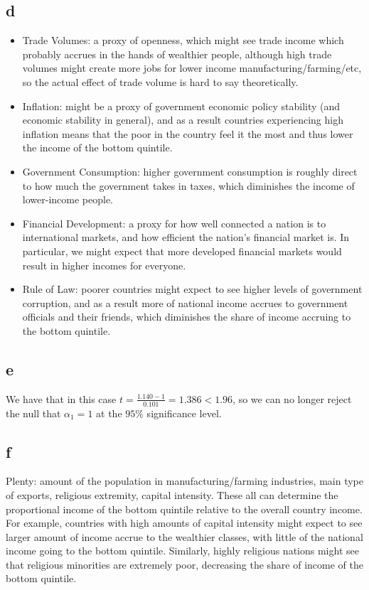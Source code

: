 \documentclass[12pt,letterpaper]{article}
\theoremstyle{definition}
\begin{document}
\subsection*{d}

\begin{itemize}
  \item Trade Volumes: a proxy of openness, which might see trade income which probably accrues in the hands of wealthier people, although high trade volumes might create more jobs for lower income manufacturing/farming/etc, so the actual effect of trade volume is hard to say theoretically.
  \item Inflation: might be a proxy of government economic policy stability (and economic stability in general), and as a result countries experiencing high inflation means that the poor in the country feel it the most and thus lower the income of the bottom quintile.
  \item Government Consumption: higher government consumption is roughly direct to how much the government takes in taxes, which diminishes the income of lower-income people.
  \item Financial Development: a proxy for how well connected a nation is to international markets, and how efficient the nation's financial market is. In particular, we might expect that more developed financial markets would result in higher incomes for everyone.
  \item Rule of Law: poorer countries might expect to see higher levels of government corruption, and as a result more of national income accrues to government officials and their friends, which diminishes the share of income accruing to the bottom quintile.
\end{itemize}

\subsection*{e}

We have that in this case $t = \frac{1.140 - 1}{0.101} = 1.386 < 1.96$, so we can no longer reject the null that $\alpha_{1} = 1$ at the $95\%$ significance level.

\subsection*{f}

Plenty: amount of the population in manufacturing/farming industries, main type of exports, religious extremity, capital intensity. These all can determine the proportional income of the bottom quintile relative to the overall country income. For example, countries with high amounts of capital intensity might expect to see larger amount of income accrue to the wealthier classes, with little of the national income going to the bottom quintile. Similarly, highly religious nations might see that religious minorities are extremely poor, decreasing the share of income of the bottom quintile.
\end{document}
